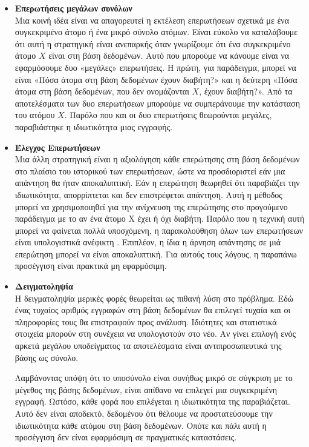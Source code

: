 \begin{itemize}
   
\item \textbf{Επερωτήσεις μεγάλων συνόλων}\\
Μια κοινή ιδέα είναι να απαγορευτεί η εκτέλεση επερωτήσεων σχετικά με ένα συγκεκριμένο άτομο ή ένα μικρό σύνολο ατόμων. Είναι εύκολο να καταλάβουμε ότι αυτή η στρατηγική είναι ανεπαρκής όταν γνωρίζουμε ότι ένα συγκεκριμένο άτομο $X$ είναι στη βάση δεδομένων. Αυτό που μπορούμε να κάνουμε είναι να εφαρμόσουμε δυο «μεγάλες» επερωτήσεις. Η πρώτη, για παράδειγμα, μπορεί να είναι «Πόσα άτομα στη βάση δεδομένων έχουν διαβήτη?» και η δεύτερη «Πόσα άτομα στη βάση δεδομένων, που δεν ονομάζονται $X$, έχουν διαβήτη?». Από τα αποτελέσματα των δυο επερωτήσεων μπορούμε να συμπεράνουμε την κατάσταση του ατόμου $X$. Παρόλο που και οι δυο επερωτήσεις θεωρούνται μεγάλες, παραβιάστηκε η ιδιωτικότητα μιας εγγραφής.

\item \textbf{Έλεγχος Επερωτήσεων}\\
Μια άλλη στρατηγική είναι η αξιολόγηση κάθε επερώτησης στη βάση δεδομένων στο πλαίσιο του ιστορικού των επερωτήσεων, ώστε να προσδιοριστεί εάν μια απάντηση θα ήταν αποκαλυπτική. Εάν η επερώτηση θεωρηθεί ότι παραβιάζει την ιδιωτικότητα, απορρίπτεται και δεν επιστρέφεται απάντηση. Αυτή η μέθοδος μπορεί να χρησιμοποιηθεί για την ανίχνευση της επερώτησης στο προγούμενο παράδειγμα με το αν ένα άτομο Χ έχει ή όχι διαβήτη. Παρόλο που η τεχνική αυτή μπορεί να φαίνεται πολλά υποσχόμενη, η παρακολούθηση όλων των επερωτήσεων είναι υπολογιστικά ανέφικτη \textlatin{\cite{kleinberg1998segmentation}}. Επιπλέον, η ίδια η άρνηση απάντησης σε μιά επερώτηση μπορεί να είναι αποκαλυπτική. Για αυτούς τους λόγους, η παραπάνω προσέγγιση είναι πρακτικά μη εφαρμόσιμη.

\item \textbf{Δειγματοληψία}\\
Η δειγματοληψία μερικές φορές θεωρείται ως πιθανή λύση στο πρόβλημα. Εδώ ένας τυχαίος αριθμός εγγραφών στη βάση δεδομένων θα επιλεγεί τυχαία και οι πληροφορίες τους θα επιστραφούν προς ανάλυση. Ιδιότητες και στατιστικά στοιχεία μπορούν στη συνέχεια να υπολογιστούν στο νέο. Αν γίνει επιλογή ενός αρκετά μεγάλου υποδείγματος τα αποτελέσματα είναι αντιπροσωπευτικά της βάσης ως σύνολο.

Λαμβάνοντας υπόψη ότι το υποσύνολο είναι συνήθως μικρό σε σύγκριση με το μέγεθος της βάσης δεδομένων, είναι απίθανο να επιλεγεί μια συγκεκριμένη εγγραφή. Ωστόσο, κάθε φορά που επιλέγεται η ιδιωτικότητα της παραβιάζεται. Αυτό δεν είναι αποδεκτό, δεδομένου ότι θέλουμε να προστατεύσουμε την ιδιωτικότητα κάθε ατόμου στη βάση δεδομένων. Οπότε και πάλι αυτή η προσέγγιση δεν είναι εφαρμόσιμη σε πραγματικές καταστάσεις.


\end{itemize}
